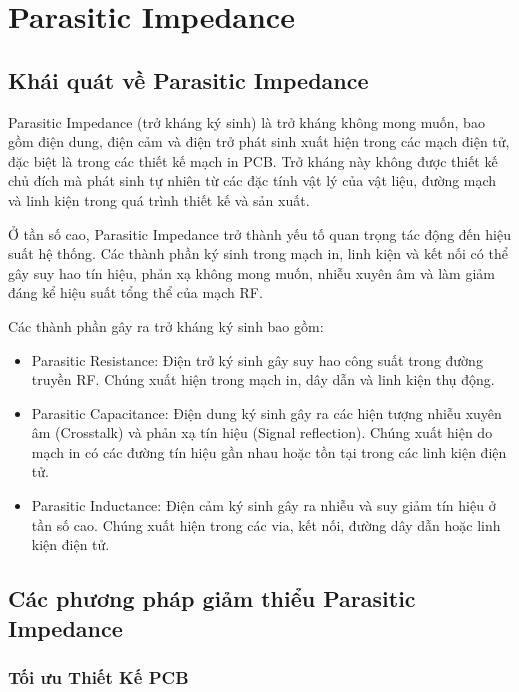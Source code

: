 \chapter{Parasitic Impedance}

\section{Khái quát về Parasitic Impedance}

\hspace{13pt} Parasitic Impedance (trở kháng ký sinh) là trở kháng không mong muốn, bao gồm điện dung, điện cảm và điện trở phát sinh xuất hiện trong các mạch điện tử, đặc biệt là trong các thiết kế mạch in PCB. Trở kháng này không được thiết kế chủ đích mà phát sinh tự nhiên từ các đặc tính vật lý của vật liệu, đường mạch và linh kiện trong quá trình thiết kế và sản xuất.

Ở tần số cao, Parasitic Impedance trở thành yếu tố quan trọng tác động đến hiệu suất hệ thống. Các thành phần ký sinh trong mạch in, linh kiện và kết nối có thể gây suy hao tín hiệu, phản xạ không mong muốn, nhiễu xuyên âm và làm giảm đáng kể hiệu suất tổng thể của mạch RF.

Các thành phần gây ra trở kháng ký sinh bao gồm:
\begin{itemize}
    \item Parasitic Resistance: Điện trở ký sinh gây suy hao công suất trong đường truyền RF. Chúng xuất hiện trong mạch in, dây dẫn và linh kiện thụ động.
    \item Parasitic Capacitance: Điện dung ký sinh gây ra các hiện tượng nhiễu xuyên âm (Crosstalk) và phản xạ tín hiệu (Signal reflection). Chúng xuất hiện do mạch in có các đường tín hiệu gần nhau hoặc tồn tại trong các linh kiện điện tử.
    \item Parasitic Inductance: Điện cảm ký sinh gây ra nhiễu và suy giảm tín hiệu ở tần số cao. Chúng xuất hiện trong các via, kết nối, đường dây dẫn hoặc linh kiện điện tử.
\end{itemize}

\section{Các phương pháp giảm thiểu Parasitic Impedance}

\subsection{Tối ưu Thiết Kế PCB}

